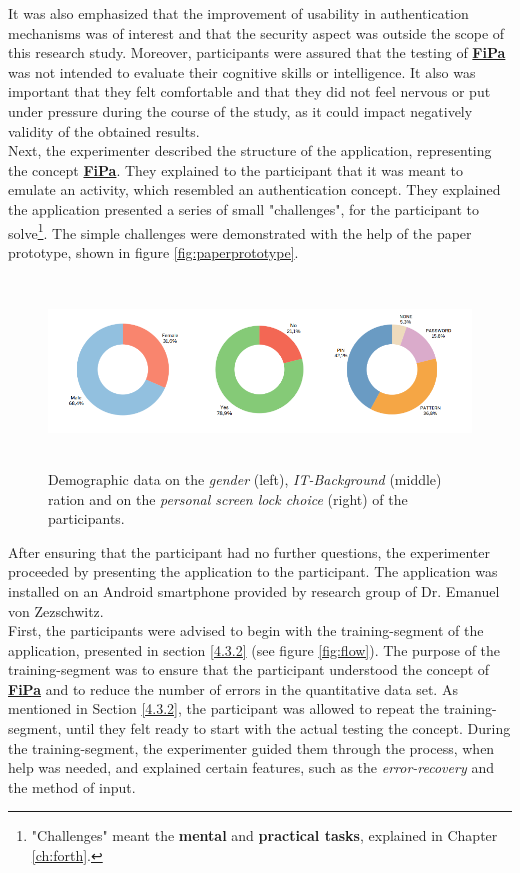It was also emphasized that the improvement of usability in authentication mechanisms was of interest and that the security aspect was outside the scope of this research study. Moreover, participants were assured that the testing of \underline{\textbf{FiPa}} was not intended to evaluate their cognitive skills or intelligence. It also was important that they felt comfortable and that they did not feel nervous or put under pressure during the course of the study, as it could impact negatively validity of the obtained results.\\

Next, the experimenter described the structure of the application, representing the concept \underline{\textbf{FiPa}}. They explained to the participant that it was meant to emulate an activity, which resembled an authentication concept. They explained the application presented a series of small "challenges", for the participant to solve\footnote{"Challenges"  meant the \textbf{mental} and \textbf{practical tasks}, explained in Chapter \ref{ch:forth}.}. The simple challenges were demonstrated with the help of the paper prototype, shown in figure \ref{fig:paperprototype}.\\

\begin{figure}[t!]
\centering
\includegraphics[width=15cm, height=5cm]{Chapters/graphics/Demos.PNG}
\caption{Demographic data on the \textit{gender} (left), \textit{IT-Background} (middle) ration and on the \textit{personal screen lock choice} (right) of the participants.}
\label{fig:demo}
\end{figure}

After ensuring that the participant had no further questions, the experimenter proceeded by presenting the application to the participant. The application was installed on an Android smartphone provided by research group of Dr. Emanuel von Zezschwitz.\\
First, the participants were advised to begin with the training-segment of the application, presented in section \ref{4.3.2} (see figure \ref{fig:flow}). The purpose of the training-segment was to ensure that the participant understood the concept of \underline{\textbf{FiPa}} and to reduce the number of errors in the quantitative data set. As mentioned in Section \ref{4.3.2}, the participant was allowed to repeat the training-segment, until they felt ready to start with the actual testing the concept. During the training-segment, the experimenter guided them through the process, when help was needed, and explained certain features, such as the \textit{error-recovery} and the method of input. \\

